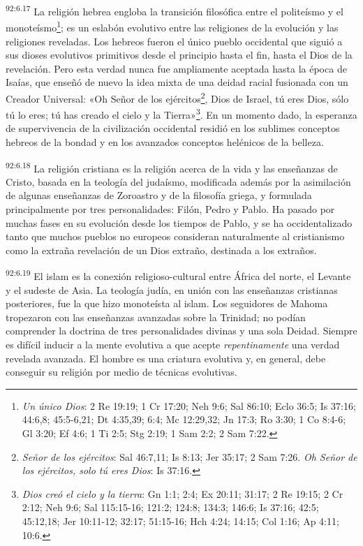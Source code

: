 \par
\textsuperscript{92:6.17} La religión hebrea engloba la transición filosófica entre el politeísmo y el monoteísmo\footnote{\textit{Un único Dios}: 2 Re 19:19; 1 Cr 17:20; Neh 9:6; Sal 86:10; Eclo 36:5; Is 37:16; 44:6,8; 45:5-6,21; Dt 4:35,39; 6:4; Mc 12:29,32; Jn 17:3; Ro 3:30; 1 Co 8:4-6; Gl 3:20; Ef 4:6; 1 Ti 2:5; Stg 2:19; 1 Sam 2:2; 2 Sam 7:22.}; es un eslabón evolutivo entre las religiones de la evolución y las religiones reveladas. Los hebreos fueron el único pueblo occidental que siguió a sus dioses evolutivos primitivos desde el principio hasta el fin, hasta el Dios de la revelación. Pero esta verdad nunca fue ampliamente aceptada hasta la época de Isaías, que enseñó de nuevo la idea mixta de una deidad racial fusionada con un Creador Universal: «Oh Señor de los ejércitos\footnote{\textit{Señor de los ejércitos}: Sal 46:7,11; Is 8:13; Jer 35:17; 2 Sam 7:26. \textit{Oh Señor de los ejércitos, solo tú eres Dios}: Is 37:16.}, Dios de Israel, tú eres Dios, sólo tú lo eres; tú has creado el cielo y la Tierra»\footnote{\textit{Dios creó el cielo y la tierra}: Gn 1:1; 2:4; Ex 20:11; 31:17; 2 Re 19:15; 2 Cr 2:12; Neh 9:6; Sal 115:15-16; 121:2; 124:8; 134:3; 146:6; Is 37:16; 42:5; 45:12,18; Jer 10:11-12; 32:17; 51:15-16; Hch 4:24; 14:15; Col 1:16; Ap 4:11; 10:6.}. En un momento dado, la esperanza de supervivencia de la civilización occidental residió en los sublimes conceptos hebreos de la bondad y en los avanzados conceptos helénicos de la belleza.

\par
\textsuperscript{92:6.18} La religión cristiana es la religión acerca de la vida y las enseñanzas de Cristo, basada en la teología del judaísmo, modificada además por la asimilación de algunas enseñanzas de Zoroastro y de la filosofía griega, y formulada principalmente por tres personalidades: Filón, Pedro y Pablo. Ha pasado por muchas fases en su evolución desde los tiempos de Pablo, y se ha occidentalizado tanto que muchos pueblos no europeos consideran naturalmente al cristianismo como la extraña revelación de un Dios extraño, destinada a los extraños.

\par
\textsuperscript{92:6.19} El islam es la conexión religioso-cultural entre África del norte, el Levante y el sudeste de Asia. La teología judía, en unión con las enseñanzas cristianas posteriores, fue la que hizo monoteísta al islam. Los seguidores de Mahoma tropezaron con las enseñanzas avanzadas sobre la Trinidad; no podían comprender la doctrina de tres personalidades divinas y una sola Deidad. Siempre es difícil inducir a la mente evolutiva a que acepte \textit{repentinamente} una verdad revelada avanzada. El hombre es una criatura evolutiva y, en general, debe conseguir su religión por medio de técnicas evolutivas.

